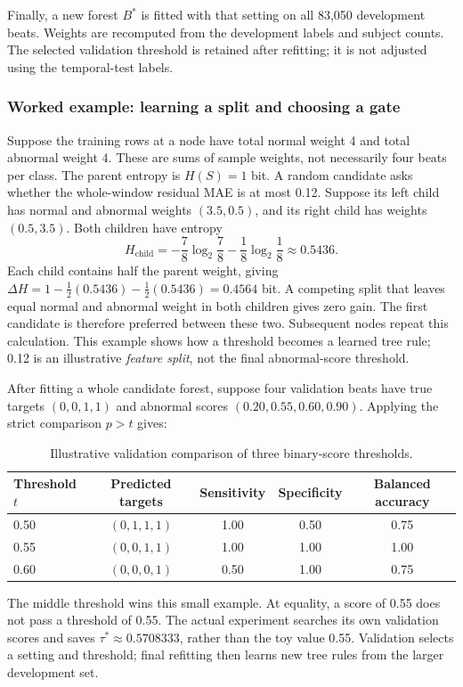 Finally, a new forest $B^*$ is fitted with that setting on all 83,050
development beats. Weights are recomputed from the development labels and
subject counts. The selected validation threshold is retained after refitting;
it is not adjusted using the temporal-test labels.

\subsubsection*{Worked example: learning a split and choosing a gate}

Suppose the training rows at a node have total normal weight 4 and total
abnormal weight 4. These are sums of sample weights, not necessarily four
beats per class. The parent entropy is $H(S)=1$ bit. A random candidate
asks whether the whole-window residual MAE is at most 0.12. Suppose its
left child has normal and abnormal weights $(3.5,0.5)$, and its right child
has weights $(0.5,3.5)$. Both children have entropy
\begin{equation}
 H_{\mathrm{child}}=-\frac{7}{8}\log_2\frac{7}{8}
                    -\frac{1}{8}\log_2\frac{1}{8}
                    \approx0.5436.
 \label{eq:method-example-weighted-entropy}
\end{equation}
Each child contains half the parent weight, giving
$\Delta H=1-\tfrac12(0.5436)-\tfrac12(0.5436)=0.4564$ bit.
A competing split that leaves equal normal and abnormal weight in both
children gives zero gain. The first candidate is therefore preferred between
these two. Subsequent nodes repeat this calculation. This example shows how
a threshold becomes a learned tree rule; 0.12 is an illustrative \emph{feature
split}, not the final abnormal-score threshold.

After fitting a whole candidate forest, suppose four validation beats have
true targets $(0,0,1,1)$ and abnormal scores $(0.20,0.55,0.60,0.90)$.
Applying the strict comparison $p>t$ gives:
\begin{table}[H]
\centering
\small
\caption{Illustrative validation comparison of three binary-score thresholds.}
\label{tab:method-example-threshold}
\begin{tabular}{@{}lcccc@{}}
\toprule
Threshold $t$ & Predicted targets & Sensitivity & Specificity & Balanced accuracy\\
\midrule
0.50 & $(0,1,1,1)$ & 1.00 & 0.50 & 0.75\\
0.55 & $(0,0,1,1)$ & 1.00 & 1.00 & 1.00\\
0.60 & $(0,0,0,1)$ & 0.50 & 1.00 & 0.75\\
\bottomrule
\end{tabular}
\end{table}
The middle threshold wins this small example. At equality, a score of 0.55
does not pass a threshold of 0.55. The actual experiment searches its own
validation scores and saves $\tau^*\approx0.5708333$, rather than the toy
value 0.55. Validation selects a setting and threshold; final refitting then
learns new tree rules from the larger development set.

